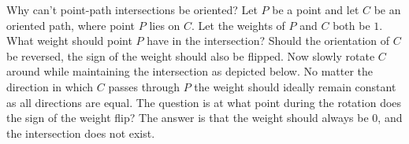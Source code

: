 %
%
%
%
%

Why can't point-path intersections be oriented? Let \(P\) be a point and let \(C\) be an oriented path, where point \(P\) lies on \(C\). Let the weights of \(P\) and \(C\) both be \(1\). What weight should point \(P\) have in the intersection? Should the orientation of \(C\) be reversed, the sign of the weight should also be flipped. Now slowly rotate \(C\) around while maintaining the intersection as depicted below. No matter the direction in which \(C\) passes through \(P\) the weight should ideally remain constant as all directions are equal. The question is at what point during the rotation does the sign of the weight flip? The answer is that the weight should always be \(0\), and the intersection does not exist.  

